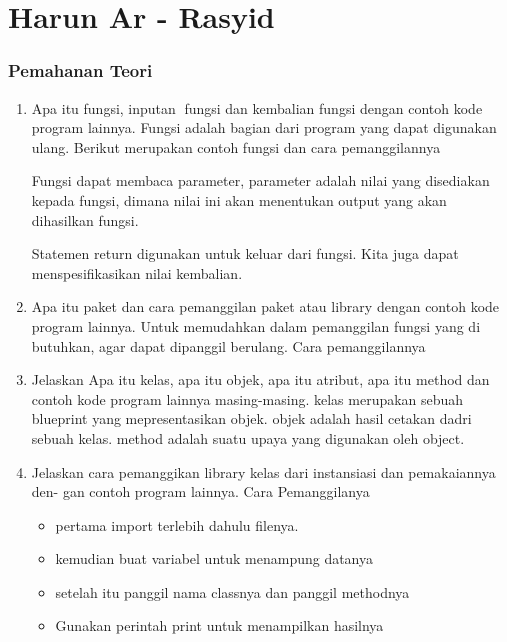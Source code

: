 \section{Harun Ar - Rasyid}
\subsubsection{Pemahanan Teori}
\begin{enumerate}
    \item Apa itu fungsi, inputan fungsi dan kembalian fungsi dengan contoh kode program
    lainnya.
    Fungsi adalah bagian dari program yang dapat digunakan ulang.
    Berikut merupakan contoh fungsi dan cara pemanggilannya
    

    Fungsi dapat membaca parameter, parameter adalah nilai yang disediakan kepada fungsi, dimana nilai ini akan menentukan output yang akan dihasilkan fungsi.
    

    Statemen return digunakan untuk keluar dari fungsi. Kita juga dapat menspesifikasikan nilai kembalian.
    

    \item Apa itu paket dan cara pemanggilan paket atau library dengan contoh kode
    program lainnya.
    Untuk memudahkan dalam pemanggilan fungsi yang di butuhkan, agar dapat dipanggil berulang.
    Cara pemanggilannya
    

    \item Jelaskan Apa itu kelas, apa itu objek, apa itu atribut, apa itu method dan
    contoh kode program lainnya masing-masing.
    kelas merupakan sebuah blueprint yang mepresentasikan objek.
    objek adalah hasil cetakan dadri sebuah kelas.
    method adalah suatu upaya yang digunakan oleh object.
    

    \item Jelaskan cara pemanggikan library kelas dari instansiasi dan pemakaiannya den-
    gan contoh program lainnya.
    Cara Pemanggilanya 
    \begin{itemize}
        \item pertama import terlebih dahulu filenya.
        \item kemudian buat variabel untuk menampung datanya
        \item setelah itu panggil nama classnya dan panggil methodnya
        \item Gunakan perintah print untuk menampilkan hasilnya


\end{itemize}
\end{enumerate}
